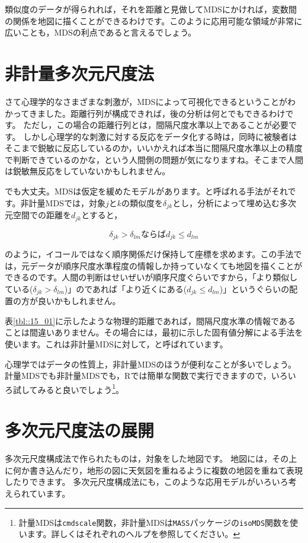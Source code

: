 \documentclass{ltjsbook}
\begin{document}
類似度のデータが得られれば，それを距離と見做してMDSにかければ，変数間の関係を地図に描くことができるわけです。このように応用可能な領域が非常に広いことも，MDSの利点であると言えるでしょう。

\section{非計量多次元尺度法}

さて心理学的なさまざまな刺激が，MDSによって可視化できるということがわかってきました。距離行列が構成できれば，後の分析は何とでもできるわけです。
ただし，この場合の距離行列とは，間隔尺度水準以上であることが必要です。
しかし心理学的な刺激に対する反応をデータ化する時は，同時に被験者はそこまで鋭敏に反応しているのか，いいかえれば本当に間隔尺度水準以上の精度で判断できているのかな，という人間側の問題が気になりますね。そこまで人間は鋭敏無反応をしていないかもしれません。

でも大丈夫。MDSは仮定を緩めたモデルがあります。と呼ばれる手法がそれです。非計量MDSでは，対象$j$と$k$の類似度を$\delta_{jk}$とし，分析によって埋め込む多次元空間での距離を$d_{jk}$とすると，

$$ \delta_{jk} > \delta_{lm} \mbox{ならば}d_{jk}\le d_{lm} $$

のように，イコールではなく順序関係だけ保持して座標を求めます。この手法では，元データが順序尺度水準程度の情報しか持っていなくても地図を描くことができるのです。人間の判断はせいぜいが順序尺度ぐらいですから，「より類似している($\delta_{jk} > \delta_{lm}$)」のであれば「より近くにある($d_{jk}\le d_{lm} $)」というぐらいの配置の方が良いかもしれません。


表\ref{tbl::15_01}に示したような物理的距離であれば，間隔尺度水準の情報であることは間違いありません。その場合には，最初に示した固有値分解による手法を使います。これは非計量MDSに対して，と呼ばれています。

心理学ではデータの性質上，非計量MDSのほうが便利なことが多いでしょう。計量MDSでも非計量MDSでも，Rでは簡単な関数で実行できますので，いろいろ試してみると良いでしょう\footnote{計量MDSは\texttt{cmdscale}関数，非計量MDSは\texttt{MASS}パッケージの\texttt{isoMDS}関数を使います。詳しくはそれぞれのヘルプを参照してください。}。


\section{多次元尺度法の展開}
多次元尺度構成法で作られたものは，対象をした地図です。
地図には，その上に何か書き込んだり，地形の図に天気図を重ねるように複数の地図を重ねて表現したりできます。
多次元尺度構成法にも，このような応用モデルがいろいろ考えられています。
\end{document}

